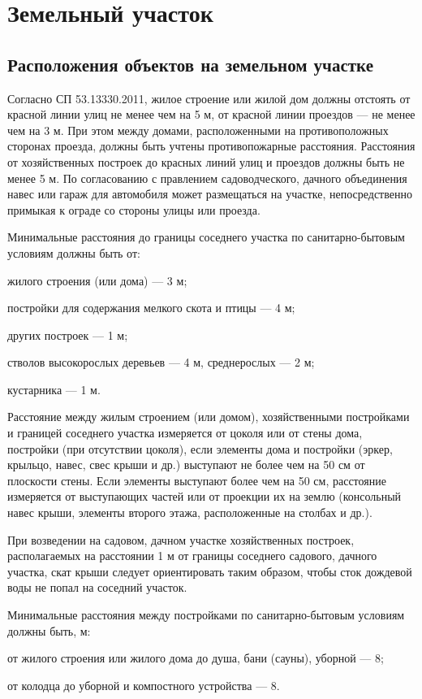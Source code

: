 \documentclass[10pt, twocolumn]{report}
\newenvironment{itemize*}%
{\begin{itemize}%
	\setlength{\itemsep}{1pt}%
	\setlength{\parskip}{1pt}}%
{\end{itemize}}
\begin{document}
\part{Земельный участок}
\chapter{Расположения объектов на земельном участке}
Согласно СП 53.13330.2011, жилое строение или жилой дом должны отстоять от красной линии улиц не менее чем на 5 м, от красной линии проездов — не менее чем на 3 м. При этом между домами, расположенными на противоположных сторонах проезда, должны быть учтены противопожарные расстояния. Расстояния от хозяйственных построек до красных линий улиц и проездов должны быть не менее 5 м. По согласованию с правлением садоводческого, дачного объединения навес или гараж для автомобиля может размещаться на участке, непосредственно примыкая к ограде со стороны улицы или проезда.

Минимальные расстояния до границы соседнего участка по санитарно-бытовым условиям должны быть от:
\begin{itemize*}
	\item жилого строения (или дома) — 3 м;
	\item постройки для содержания мелкого скота и птицы — 4 м;
	\item других построек — 1 м;
	\item стволов высокорослых деревьев — 4 м, среднерослых — 2 м;
	\item кустарника — 1 м.
\end{itemize*}

Расстояние между жилым строением (или домом), хозяйственными постройками и границей соседнего участка измеряется от цоколя или от стены дома, постройки (при
отсутствии цоколя), если элементы дома и постройки (эркер, крыльцо, навес, свес крыши и др.) выступают не более чем на 50 см от плоскости стены. Если элементы
выступают более чем на 50 см, расстояние измеряется от выступающих частей или от проекции их на землю (консольный навес крыши, элементы второго этажа, расположенные на столбах и др.).

При возведении на садовом, дачном участке хозяйственных построек, располагаемых на расстоянии 1 м от границы соседнего садового, дачного участка, скат
крыши следует ориентировать таким образом, чтобы сток дождевой воды не попал на соседний участок.


Минимальные расстояния между постройками по санитарно-бытовым условиям должны быть, м:
\begin{itemize*}
	\item от жилого строения или жилого дома до душа, бани (сауны), уборной — 8;
	\item от колодца до уборной и компостного устройства — 8.
\end{itemize*}
\end{document}
